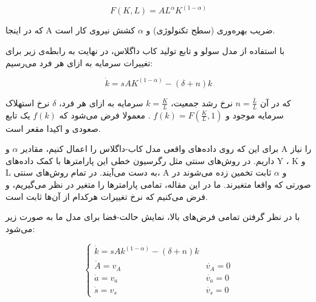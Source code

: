 \documentclass[11pt, fleqn]{article}
\begin{document}
\begin{multicols}{2}
\useshortskip
\begin{LTR}
\begin{equation}
F(K, L) = AL^\alpha K^{(1-\alpha)}
\end{equation}
\end{LTR}

که در اینجا A ضریب بهره‌وری
 (سطح تکنولوژی) و 
 $\alpha$
  کشش نیروی‌ کار است.
  
  
با استفاده از مدل سولو و تابع تولید کاب داگلاس، در نهایت به رابطه‌ی زیر برای تغییرات سرمایه به ازای هر فرد می‌رسیم:


\useshortskip
\begin{LTR}
\begin{equation}
\dot{k} = s A K^{(1-\alpha)} - (\delta + n)k
\end{equation}
\end{LTR}

که در آن
$n = \frac{\dot{L}}{L}$
نرخ رشد جمعیت،
$k = \frac{K}{L}$
 سرمایه به ازای هر فرد،
 $\delta$
  نرخ استهلاک سرمایه موجود و 
$f(k) = F(\frac{K}{L}, 1)$
. معمولا فرض می‌شود که 
 $f(k)$
 یک تابع صعودی و اکیدا مقعر است. 



	




	برای این که روی داده‌های واقعی مدل کاب-داگلاس را اعمال کنیم، مقادیر 
$\alpha$
	و A را نیاز داریم. در روش‌های سنتی مثل رگرسیون خطی این پارامترها با کمک داده‌های
Y
،
K
 و L به دست می‌آیند. در تمام روش‌های سنتی، A و 
 $\alpha$
  ثابت تخمین زده می‌شوند در صورتی که واقعا متغیرند. ما در این مقاله، تمامی پارامتر‌ها را متغیر در نظر می‌گیریم، و فرض می‌کنیم که نرخ تغییرات هرکدام از آن‌ها ثابت است. 

	با در نظر گرفتن تمامی فرض‌های بالا، نمایش حالت-فضا برای مدل ما به صورت زیر می‌شود:

\useshortskip
\begin{LTR}
\begin{equation}
\label{3}
\begin{cases}
\dot{k} = sAk^{(1-\alpha)} - (\delta + n)k

\\

\dot{A} = v_A & \dot{v_A} = 0  

\\

\dot{a} = v_a & \dot{v_a} = 0  

\\

\dot{s} = v_s & \dot{v_s} = 0  


\end{cases}
\end{equation}
\end{LTR}
\end{multicols}
\end{document}
